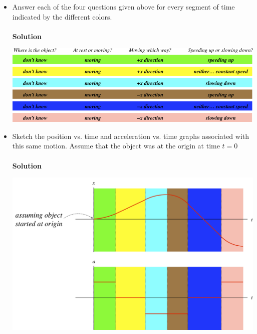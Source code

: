 \documentclass[12pt,addpoints]{exam}
\begin{document}
\begin{questions}
\begin{center}
		\end{center}
		\begin{itemize}
			\item Answer each of the four questions given above for every segment of time indicated by the different colors. \\ \\
			\textbf{Solution}
			\begin{center}
				\includegraphics[scale=0.85]{sol2.png}
			\end{center}	
			\item Sketch the position vs. time and acceleration vs. time graphs associated with this same motion. Assume that the object was at the origin at time  $t=0$ \\ \\
			\textbf{Solution}
			\begin{center}
				\includegraphics[scale=0.7]{sol3.png}
			\end{center}	
		\end{itemize}
		
		
	\end{questions}	
\end{document}
